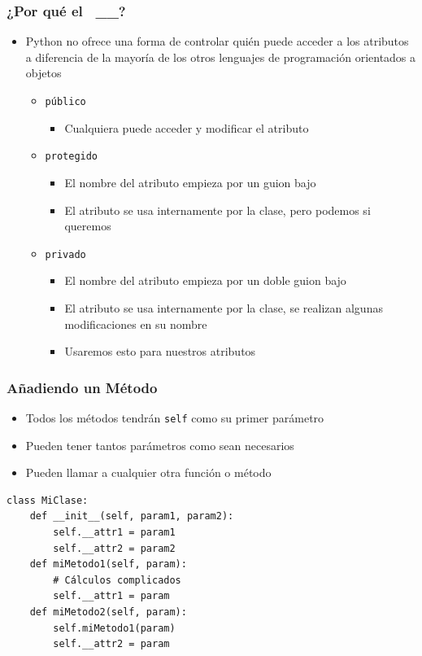 \documentclass[11pt]{beamer}
\begin{document}
\begin{frame}[fragile]\frametitle{¿Por qué el \ \_\_?}
\begin{itemize}
\item Python no ofrece una forma de controlar quién puede acceder a los atributos a diferencia de la mayoría de los otros lenguajes de programación orientados a objetos
    \begin{itemize}
    \item \texttt{público}
        \begin{itemize}
        \item Cualquiera puede acceder y modificar el atributo
        \end{itemize}
    \item \texttt{protegido}
        \begin{itemize}
        \item El nombre del atributo empieza por un guion bajo
        \item El atributo se usa internamente por la clase, pero podemos si queremos
        \end{itemize}
    \item \texttt{privado}
        \begin{itemize}
        \item El nombre del atributo empieza por un doble guion bajo
        \item El atributo se usa internamente por la clase, se realizan algunas modificaciones en su nombre
        \item Usaremos esto para nuestros atributos
        \end{itemize}
    \end{itemize}
\end{itemize}
\end{frame}

\begin{frame}[fragile]\frametitle{Añadiendo un Método}
\begin{itemize}
\item Todos los métodos tendrán \lstinline|self| como su primer parámetro
\item Pueden tener tantos parámetros como sean necesarios
\item Pueden llamar a cualquier otra función o método
\end{itemize}
\begin{lstlisting}
class MiClase:
    def __init__(self, param1, param2):
        self.__attr1 = param1
        self.__attr2 = param2
    def miMetodo1(self, param):
        # Cálculos complicados
        self.__attr1 = param
    def miMetodo2(self, param):
        self.miMetodo1(param)
        self.__attr2 = param
\end{lstlisting}
\end{frame}
\end{document}
